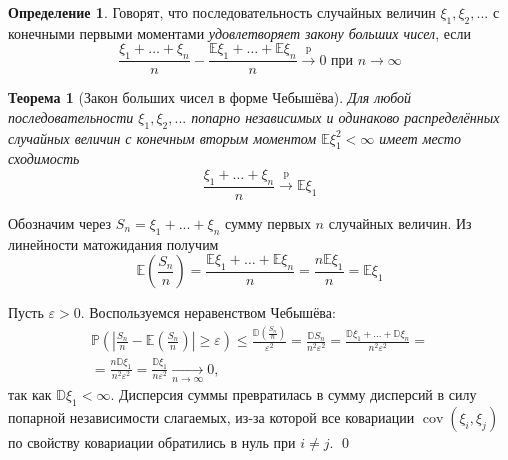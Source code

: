 \documentclass[oneside,final,14pt]{extreport}
\renewenvironment{proof}{{\bfseries Доказательство.}}{\qed}
\newtheorem{thm}{Теорема}[section]
\theoremstyle{definition}
\newtheorem{defn}{Определение}[section]
\begin{document}
\begin{defn}
    Говорят, что последовательность случайных величин $\xi_1, \xi_2, ...$ с конечными первыми моментами {\it удовлетворяет закону больших чисел}, если
    \begin{equation*}
        \frac{\xi_{1}+\ldots+\xi_{n}}{n}-\frac{\mathbb{E} \xi_{1}+\ldots+\mathbb{E} \xi_{n}}{n} \stackrel{\mathrm{p}}{\longrightarrow} 0 \text { при } n \rightarrow \infty
    \end{equation*}
\end{defn}
\begin{thm}[Закон больших чисел в форме Чебышёва]
    Для любой последовательности $\xi_1, \xi_2, ...$ попарно независимых и одинаково распределённых случайных величин с конечным вторым моментом $\mathbb{E}\xi_1^2 < \infty$ имеет место сходимость
    \begin{equation*}
        \frac{\xi_{1}+\ldots+\xi_{n}}{n} \stackrel{\mathrm{p}}{\longrightarrow} \mathbb{E} \xi_{1}
    \end{equation*}
\end{thm}
\begin{proof}
    Обозначим через $S_n = \xi_1 + ... + \xi_n$ сумму первых $n$ случайных величин. Из линейности матожидания получим
    \begin{equation*}
        \mathbb{E}\left(\frac{S_{n}}{n}\right)=\frac{\mathbb{E} \xi_{1}+\ldots+\mathbb{E} \xi_{n}}{n}=\frac{n \mathbb{E} \xi_{1}}{n}=\mathbb{E} \xi_{1}
    \end{equation*}
    
    Пусть $\varepsilon > 0.$ Воспользуемся неравенством Чебышёва:
    \begin{multline*}
        \mathbb{P}\left(\left|\frac{S_{n}}{n}-\mathbb{E}\left(\frac{S_{n}}{n}\right)\right| \geqslant \varepsilon\right) \leqslant \frac{\mathbb{D}\left(\frac{S_{n}}{n}\right)}{\varepsilon^{2}}
        = \frac{\mathbb{D} S_{n}}{n^{2} \varepsilon^{2}}
        = \frac{\mathbb{D} \xi_{1}+\ldots+\mathbb{D} \xi_{n}}{n^{2} \varepsilon^{2}}= \\
        = \frac{n \mathbb{D} \xi_{1}}{n^{2} \varepsilon^{2}}
        = \frac{\mathbb{D} \xi_{1}}{n \varepsilon^{2}} \xrightarrow[n \to \infty]{} 0,
    \end{multline*}
    так как $\mathbb{D}\xi_1 < \infty$. Дисперсия суммы превратилась в сумму дисперсий в силу попарной независимости слагаемых, из-за которой все ковариации $\operatorname{cov}(\xi_i, \xi_j)$ по свойству ковариации обратились в нуль при $i \neq j$.
\end{proof}
\end{document}
